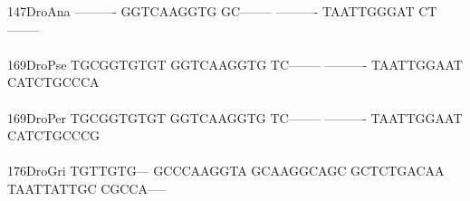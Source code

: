 \documentclass[11pt,twoside,reqno,a4paper]{article}
\begin{document}
{147\hspace*{1\charwidth}DroAna	----------	GGTCAAGGTG	GC--------	----------	TAATTGGGAT	CT--------	\\
\hspace*{4\charwidth}\hspace*{7\charwidth}\hspace*{1\charwidth}\hspace*{1\charwidth}\hspace*{1\charwidth}\hspace*{1\charwidth}\hspace*{1\charwidth}\hspace*{1\charwidth}\\
169\hspace*{1\charwidth}DroPse	TGCGGTGTGT	GGTCAAGGTG	TC--------	----------	TAATTGGAAT	CATCTGCCCA	\\
\hspace*{4\charwidth}\hspace*{7\charwidth}\hspace*{1\charwidth}\hspace*{1\charwidth}\hspace*{1\charwidth}\hspace*{1\charwidth}\hspace*{1\charwidth}\hspace*{1\charwidth}\\
169\hspace*{1\charwidth}DroPer	TGCGGTGTGT	GGTCAAGGTG	TC--------	----------	TAATTGGAAT	CATCTGCCCG	\\
\hspace*{4\charwidth}\hspace*{7\charwidth}\hspace*{1\charwidth}\hspace*{1\charwidth}\hspace*{1\charwidth}\hspace*{1\charwidth}\hspace*{1\charwidth}\hspace*{1\charwidth}\\
176\hspace*{1\charwidth}DroGri	TGTTGTG---	GCCCAAGGTA	GCAAGGCAGC	GCTCTGACAA	TAATTATTGC	CGCCA-----	\\
\hspace*{4\charwidth}\hspace*{7\charwidth}\hspace*{1\charwidth}\hspace*{1\charwidth}\hspace*{1\charwidth}\hspace*{1\charwidth}\hspace*{1\charwidth}\hspace*{1\charwidth}\\
}
\end{document}

